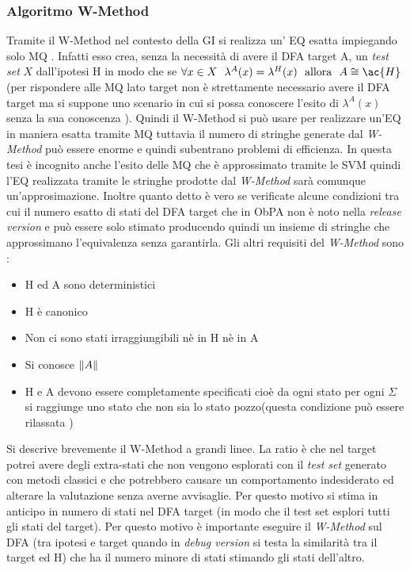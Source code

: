 \subsubsection{Algoritmo W-Method}

Tramite il W-Method nel contesto della \ac{GI} si realizza un' \ac{EQ} esatta impiegando solo \ac{MQ} \cite{Balanescu03}. Infatti esso crea, senza la necessità di avere il \ac{DFA} target A,  un \textit{test set}  $X$ dall'ipotesi \ac{H} in modo che se $\forall x \in X \:\:\: \lambda^{A}(x) = \lambda^{H}(x) \:\:\: \text{allora} \:\:\: A \cong \ac{H}$  (per rispondere alle \ac{MQ} lato target non è strettamente necessario avere il \ac{DFA} target ma si suppone uno scenario in cui si possa conoscere l'esito di $\lambda^{A}(x)$ senza la sua conoscenza ). Quindi il W-Method si può usare per realizzare un'\ac{EQ} in maniera esatta tramite \ac{MQ} tuttavia il numero di stringhe generate dal \textit{W-Method} può essere enorme e quindi subentrano problemi di efficienza. In questa tesi è incognito anche l'esito delle \ac{MQ} che è approssimato tramite le \ac{SVM} quindi l'\ac{EQ} realizzata tramite le stringhe prodotte dal \textit{W-Method} sarà comunque un'approsimazione. Inoltre quanto detto è vero se verificate alcune condizioni tra cui il numero esatto di stati del \ac{DFA} target   che in \ac{ObPA} non è noto nella \textit{release version} e può essere solo stimato producendo quindi un insieme di stringhe che approssimano l'equivalenza senza garantirla. Gli altri requisiti del \textit{W-Method} sono \cite{Balanescu03}:
\begin{itemize}
\item \ac{H} ed A sono deterministici
\item \ac{H} è canonico
\item Non ci sono stati irraggiungibili nè in \ac{H} nè in A
\item Si conosce $\lVert A\rVert$
\item \ac{H} e A devono essere completamente specificati cioè da ogni stato per ogni $\Sigma$ si raggiunge uno stato che non sia lo stato pozzo(questa condizione può essere rilassata \cite{Balanescu03})
\end{itemize}
Si descrive brevemente il W-Method a grandi linee.   La ratio è che nel target potrei avere degli extra-stati che non vengono esplorati con il \textit{test set} generato con metodi classici e che potrebbero causare un comportamento indesiderato ed alterare la valutazione senza averne avvisaglie. Per questo motivo si stima in anticipo in numero di stati nel \ac{DFA} target (in modo che il test set esplori tutti gli stati del target). Per questo motivo è importante eseguire il \textit{W-Method} sul \ac{DFA} (tra ipotesi e target quando in \textit{debug version} si testa la similarità tra il target ed \ac{H}) che ha il numero minore di stati stimando gli stati dell'altro.\\

